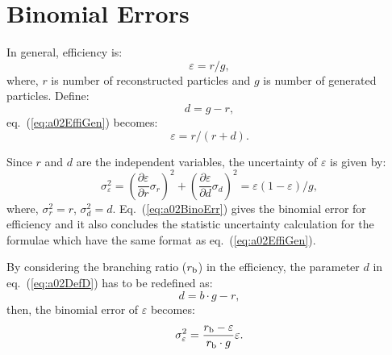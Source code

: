 \section{Binomial Errors}
\label{sec:a02BinoErr}

In general, efficiency is:
\begin{equation}\label{eq:a02EffiGen}
\varepsilon=r/g,
\end{equation}
where,
$r$ is number of reconstructed particles and
$g$ is number of generated particles.
Define:
\begin{equation}\label{eq:a02DefD}
d=g-r,
\end{equation}
eq.~(\ref{eq:a02EffiGen}) becomes:
\begin{equation}
\varepsilon=r/(r+d).
\end{equation}

Since $r$ and $d$ are the independent variables,
the uncertainty of $\varepsilon$ is given by:
\begin{equation}\label{eq:a02BinoErr}
\sigma_{\varepsilon}^{2}=
(\frac{\partial\varepsilon}{\partial r}\sigma_{r})^{2}+
(\frac{\partial\varepsilon}{\partial d}\sigma_{d})^{2}=
\varepsilon(1-\varepsilon)/g,
\end{equation}
where, $\sigma_{r}^{2}=r$, $\sigma_{d}^{2}=d$.
Eq.~(\ref{eq:a02BinoErr}) gives the binomial error for efficiency
and it also concludes the statistic uncertainty calculation for the formulae
which have the same format as eq.~(\ref{eq:a02EffiGen}).

By considering the branching ratio ($r_{\rm b}$) in the efficiency,
the parameter $d$ in eq.~(\ref{eq:a02DefD}) has to be redefined as:
\begin{equation}
d=b\cdot g-r,
\end{equation}
then, the binomial error of $\varepsilon$ becomes:
\begin{equation}\label{eq:a02BinoErrBR}
\sigma_{\varepsilon}^{2}=
\frac{r_{\rm b}-\varepsilon}{r_{\rm b}\cdot g}\varepsilon.
\end{equation}
